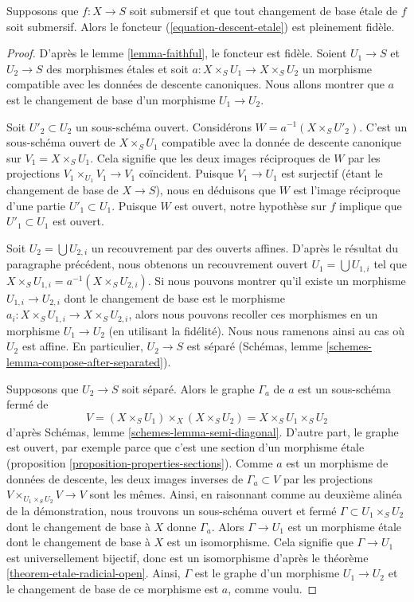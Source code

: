 \begin{lemma}
\label{lemma-fully-faithful}
Supposons que $f : X \to S$ soit submersif et que tout changement de base \'etale
de $f$ soit submersif. Alors le foncteur
(\ref{equation-descent-etale}) est pleinement fidèle.
\end{lemma}

\begin{proof}
D'après le lemme \ref{lemma-faithful}, le foncteur est fidèle.
Soient $U_1 \to S$ et $U_2 \to S$ des morphismes \'etales
et soit $a : X \times_S U_1 \to X \times_S U_2$ un
morphisme compatible avec les données de descente canoniques.
Nous allons montrer que $a$ est le changement de base d'un morphisme $U_1 \to U_2$.

\medskip\noindent
Soit $U'_2 \subset U_2$ un sous-schéma ouvert. Considérons
$W = a^{-1}(X \times_S U'_2)$. C'est un sous-schéma ouvert
de $X \times_S U_1$ compatible avec la donnée de descente
canonique sur $V_1 = X \times_S U_1$. Cela signifie que les
deux images réciproques de $W$ par les projections
$V_1 \times_{U_1} V_1 \to V_1$ coïncident. Puisque $V_1 \to U_1$
est surjectif (étant le changement de base de $X \to S$), nous en déduisons
que $W$ est l'image réciproque d'une partie $U'_1 \subset U_1$.
Puisque $W$ est ouvert, notre hypothèse sur $f$ implique que $U'_1 \subset U_1$
est ouvert.

\medskip\noindent
Soit $U_2 = \bigcup U_{2, i}$ un recouvrement par des ouverts affines.
D'après le résultat du paragraphe précédent, nous obtenons un recouvrement ouvert
$U_1 = \bigcup U_{1, i}$ tel que
$X \times_S U_{1, i} = a^{-1}(X \times_S U_{2, i})$.
Si nous pouvons montrer qu'il existe un morphisme $U_{1, i} \to U_{2, i}$
dont le changement de base est le morphisme
$a_i : X \times_S U_{1, i} \to X \times_S U_{2, i}$,
alors nous pouvons recoller ces morphismes en un morphisme $U_1 \to U_2$
(en utilisant la fidélité). Nous nous ramenons ainsi au cas où
$U_2$ est affine. En particulier, $U_2 \to S$ est séparé
(Schémas, lemme \ref{schemes-lemma-compose-after-separated}).

\medskip\noindent
Supposons que $U_2 \to S$ soit séparé. Alors le graphe $\Gamma_a$ de $a$
est un sous-schéma fermé de
$$
V = (X \times_S U_1) \times_X (X \times_S U_2) = X \times_S U_1 \times_S U_2
$$
d'après Schémas, lemme \ref{schemes-lemma-semi-diagonal}.
D'autre part, le graphe est ouvert, par exemple
parce que c'est une section d'un morphisme \'etale
(proposition \ref{proposition-properties-sections}).
Comme $a$ est un morphisme de données de descente, les deux images inverses de
$\Gamma_a \subset V$ par les projections
$V \times_{U_1 \times_S U_2} V \to V$ sont les mêmes.
Ainsi, en raisonnant comme au deuxième alinéa de la démonstration, nous
trouvons un sous-schéma ouvert et fermé $\Gamma \subset U_1 \times_S U_2$
dont le changement de base à $X$ donne $\Gamma_a$. Alors
$\Gamma \to U_1$ est un morphisme \'etale dont le changement de base
à $X$ est un isomorphisme. Cela signifie que $\Gamma \to U_1$
est universellement bijectif, donc est un isomorphisme
d'après le théorème \ref{theorem-etale-radicial-open}.
Ainsi, $\Gamma$ est le graphe d'un morphisme $U_1 \to U_2$
et le changement de base de ce morphisme est $a$, comme voulu.
\end{proof}

